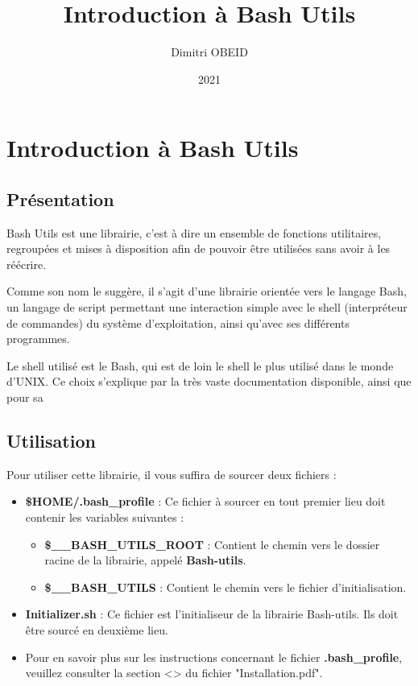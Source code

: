 \documentclass[a4paper,10pt]{article}
\title{Introduction à Bash Utils}
\author{Dimitri OBEID}
\date{2021}
\begin{document}
\maketitle
\newpage

\tableofcontents
\newpage

\section{Introduction à Bash Utils}
\subsection{Présentation}
Bash Utils est une librairie, c'est à dire un ensemble de fonctions utilitaires, regroupées et mises à disposition afin de pouvoir être utilisées sans avoir à les réécrire.

Comme son nom le suggère, il s'agit d'une librairie orientée vers le langage Bash, un langage de script permettant une interaction simple avec le shell (interpréteur de commandes) du système d'exploitation, ainsi qu'avec ses différents programmes.

Le shell utilisé est le Bash, qui est de loin le shell le plus utilisé dans le monde d'UNIX. Ce choix s'explique par la très vaste documentation disponible, ainsi que pour sa

\subsection{Utilisation}
Pour utiliser cette librairie, il vous suffira de sourcer deux fichiers :
\begin{itemize}
    \item \textbf{\$HOME/.bash\_profile} : Ce fichier à sourcer en tout premier lieu doit contenir les variables suivantes :
    \begin{itemize}
        \item \textbf{\$\_\_BASH\_UTILS\_ROOT} : Contient le chemin vers le dossier racine de la librairie, appelé \textbf{Bash-utils}.
        \item \textbf{\$\_\_BASH\_UTILS} : Contient le chemin vers le fichier d'initialisation.
    \end{itemize}

    \item \textbf{Initializer.sh} : Ce fichier est l'initialiseur de la librairie Bash-utils. Ils doit être sourcé en deuxième lieu.
    
    \item Pour en savoir plus sur les instructions concernant le fichier \textbf{.bash\_profile}, veuillez consulter la section <> du fichier "Installation.pdf".
\end{itemize}
\end{document}
